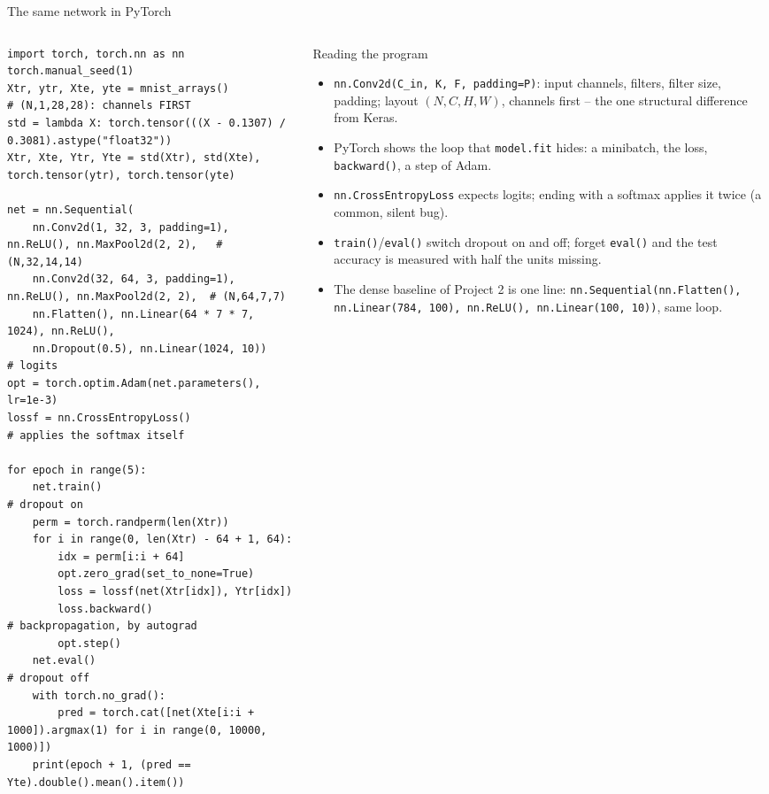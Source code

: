 \documentclass[10pt,aspectratio=169]{beamer}
\begin{document}
\begin{frame}[fragile]{The same network in PyTorch}
\lstset{basicstyle=\ttfamily\tiny}
\begin{columns}[T]
\begin{column}{0.56\textwidth}
\begin{lstlisting}
import torch, torch.nn as nn
torch.manual_seed(1)
Xtr, ytr, Xte, yte = mnist_arrays()               # (N,1,28,28): channels FIRST
std = lambda X: torch.tensor(((X - 0.1307) / 0.3081).astype("float32"))
Xtr, Xte, Ytr, Yte = std(Xtr), std(Xte), torch.tensor(ytr), torch.tensor(yte)

net = nn.Sequential(
    nn.Conv2d(1, 32, 3, padding=1), nn.ReLU(), nn.MaxPool2d(2, 2),   # (N,32,14,14)
    nn.Conv2d(32, 64, 3, padding=1), nn.ReLU(), nn.MaxPool2d(2, 2),  # (N,64,7,7)
    nn.Flatten(), nn.Linear(64 * 7 * 7, 1024), nn.ReLU(),
    nn.Dropout(0.5), nn.Linear(1024, 10))                            # logits
opt = torch.optim.Adam(net.parameters(), lr=1e-3)
lossf = nn.CrossEntropyLoss()                     # applies the softmax itself

for epoch in range(5):
    net.train()                                   # dropout on
    perm = torch.randperm(len(Xtr))
    for i in range(0, len(Xtr) - 64 + 1, 64):
        idx = perm[i:i + 64]
        opt.zero_grad(set_to_none=True)
        loss = lossf(net(Xtr[idx]), Ytr[idx])
        loss.backward()                           # backpropagation, by autograd
        opt.step()
    net.eval()                                    # dropout off
    with torch.no_grad():
        pred = torch.cat([net(Xte[i:i + 1000]).argmax(1) for i in range(0, 10000, 1000)])
    print(epoch + 1, (pred == Yte).double().mean().item())
\end{lstlisting}
\end{column}
\begin{column}{0.42\textwidth}
\footnotesize
\begin{block}{Reading the program}
\begin{itemize}
  \item \texttt{nn.Conv2d(C\_in, K, F, padding=P)}: input channels,
        filters, filter size, padding; layout $(N,C,H,W)$, channels
        first -- the one structural difference from Keras.
  \item PyTorch shows the loop that \texttt{model.fit} hides: a minibatch,
        the loss, \texttt{backward()}, a step of Adam.
  \item \texttt{nn.CrossEntropyLoss} expects logits; ending with a softmax
        applies it twice (a common, silent bug).
  \item \texttt{train()}/\texttt{eval()} switch dropout on and off; forget
        \texttt{eval()} and the test accuracy is measured with half the
        units missing.
  \item The dense baseline of Project 2 is one line:
        \texttt{nn.Sequential(nn.Flatten(), nn.Linear(784, 100), nn.ReLU(),
        nn.Linear(100, 10))}, same loop.
\end{itemize}
\end{block}
\end{column}
\end{columns}
\end{frame}
\end{document}
